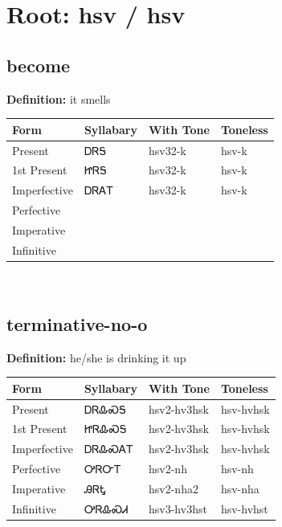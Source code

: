 \documentclass{article}%
\begin{document}
%
\normalsize%
\section*{Root: hsv / hsv}%
\subsection*{become}%
\textbf{Definition: }%
it smells%
\\[0.5em]%
\begin{tabular}{|l|l|l|l|}%
\hline%
\textbf{Form}&\textbf{Syllabary}&\textbf{With Tone}&\textbf{Toneless}\\%
\hline%
Present&ᎠᏒᎦ&hsv32{-}k&hsv{-}k\\%
1st Present&ᏥᏒᎦ&hsv32{-}k&hsv{-}k\\%
Imperfective&ᎠᏒᎪᎢ&hsv32{-}k&hsv{-}k\\%
Perfective&&&\\%
Imperative&&&\\%
Infinitive&&&\\%
\hline%
\end{tabular}%
\\[1em]%
\subsection*{terminative-no-o}%
\textbf{Definition: }%
he/she is drinking it up%
\\[0.5em]%
\begin{tabular}{|l|l|l|l|}%
\hline%
\textbf{Form}&\textbf{Syllabary}&\textbf{With Tone}&\textbf{Toneless}\\%
\hline%
Present&ᎠᏒᎲᏍᎦ&hsv2{-}hv3hsk&hsv{-}hvhsk\\%
1st Present&ᏥᏒᎲᏍᎦ&hsv2{-}hv3hsk&hsv{-}hvhsk\\%
Imperfective&ᎠᏒᎲᏍᎪᎢ&hsv2{-}hv3hsk&hsv{-}hvhsk\\%
Perfective&ᎤᏒᏅᎢ&hsv2{-}nh&hsv{-}nh\\%
Imperative&ᎯᏒᎿ&hsv2{-}nha2&hsv{-}nha\\%
Infinitive&ᎤᏒᎲᏍᏗ&hsv3{-}hv3hst&hsv{-}hvhst\\%
\hline%
\end{tabular}%
\\[1em]%
\end{document}
